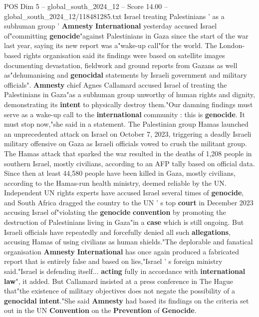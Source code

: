 \begin{textsample}{POS Dim 5 – global\_south\_2024\_12 – Score 14.00 – global\_south\_2024\_12/118481285.txt}  \label{ex:f5_pos_059}
Israel treating Palestinians ' as a subhuman group ' \textbf{Amnesty} \textbf{International} yesterday accused Israel of"committing \textbf{genocide}"against Palestinians in Gaza since the start of the war last year, saying its new report was a"wake-up call"for the world.
The London-based rights organisation said its findings were based on satellite images documenting devastation, fieldwork and ground reports from Gazans as well as"dehumanising and \textbf{genocidal} statements by Israeli government and military officials". \textbf{Amnesty} chief Agnes Callamard accused Israel of treating the Palestinians in Gaza"as a subhuman group unworthy of human rights and dignity, demonstrating its \textbf{intent} to physically destroy them."Our damning findings must serve as a wake-up call to the \textbf{international} community : this is \textbf{genocide}.
It must stop now,"she said in a statement.
The Palestinian group Hamas launched an unprecedented attack on Israel on October 7, 2023, triggering a deadly Israeli military offensive on Gaza as Israeli officials vowed to crush the militant group.
The Hamas attack that sparked the war resulted in the deaths of 1,208 people in southern Israel, mostly civilians, according to an AFP tally based on official data.
Since then at least 44,580 people have been killed in Gaza, mostly civilians, according to the Hamas-run health ministry, deemed reliable by the UN.
Independent UN rights experts have accused Israel several times of \textbf{genocide}, and South Africa dragged the country to the UN ' s top \textbf{court} in December 2023 accusing Israel of"violating the \textbf{genocide} \textbf{convention} by promoting the destruction of Palestinians living in Gaza"in a \textbf{case} which is still ongoing.
But Israeli officials have repeatedly and forcefully denied all such \textbf{allegations}, accusing Hamas of using civilians as human shields."The deplorable and fanatical organisation \textbf{Amnesty} \textbf{International} has once again produced a fabricated report that is entirely false and based on lies,"Israel ' s foreign ministry said."Israel is defending itself... \textbf{acting} fully in accordance with \textbf{international} \textbf{law}", it added.
But Callamard insisted at a press conference in The Hague that"the existence of military objectives does not negate the possibility of a \textbf{genocidal} \textbf{intent}."She said \textbf{Amnesty} had based its findings on the criteria set out in the UN \textbf{Convention} on the \textbf{Prevention} of \textbf{Genocide}.

\end{textsample}

